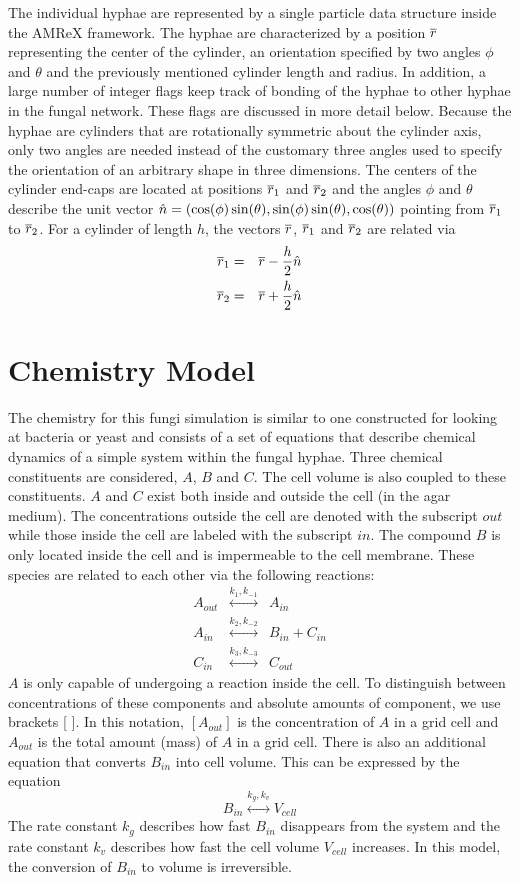 \documentclass[12pt]{article}
\begin{document}
The individual hyphae are represented by a single particle data structure inside
the AMReX framework. The hyphae are characterized by a position $\overline{r}$
representing the center of the cylinder, an orientation
specified by two angles $\phi$ and $\theta$ and the previously mentioned cylinder
length and radius. In addition, a large number of integer flags keep track of
bonding of the hyphae to other hyphae in the fungal network. These flags are
discussed in more detail below. Because the hyphae are cylinders that are rotationally
symmetric about the cylinder axis, only two angles are needed instead of the
customary three angles used to specify the orientation of an arbitrary shape
in three dimensions. The centers of the cylinder end-caps are located at positions
$\overline{r}_1$ and $\overline{r}_2$ and the angles $\phi$ and $\theta$ describe the unit vector
$\hat{n} = (\cos(\phi)\sin(\theta),\sin(\phi)\sin(\theta),\cos(\theta))$ pointing
from $\overline{r}_1$ to $\overline{r}_2$. For a cylinder of length $h$, the vectors $\overline{r}$,
$\overline{r}_1$ and $\overline{r}_2$ are related via
\begin{eqnarray*}
\overline{r}_1 & = & \overline{r} - \frac{h}{2}\hat{n} \\
\overline{r}_2 & = & \overline{r} + \frac{h}{2}\hat{n}
\end{eqnarray*}

\section{Chemistry Model}
The chemistry for this fungi simulation is similar to one constructed for looking
at bacteria or yeast and consists of a set
of equations that describe chemical dynamics of a simple system within
the fungal hyphae. Three chemical
constituents are considered, $A$, $B$
and $C$. The cell volume is also coupled to these constituents. $A$ and $C$
exist both inside and outside the cell (in the
agar medium). The concentrations outside the cell are denoted with the
subscript $out$ while those inside the cell are labeled
with the subscript $in$. The compound $B$ is only located inside the cell and
is impermeable to the cell membrane.
These species are related to each other via the following reactions:
\begin{eqnarray*}
A_{out} &\stackrel{k_{1},k_{-1}}{\longleftrightarrow}& A_{in} \\
A_{in} &\stackrel{k_2,k_{-2}}{\longleftrightarrow}& B_{in} + C_{in} \\
C_{in} &\stackrel{k_3,k_{-3}}{\longleftrightarrow}& C_{out}
\end{eqnarray*}
$A$ is only capable of undergoing a reaction inside the cell.  To distinguish
between concentrations of these components and absolute amounts of component, we use
brackets [ ]. In this notation, $[A_{out}]$ is the concentration of $A$ in a grid cell and
$A_{out}$ is the total amount (mass) of $A$ in a grid cell. There is also an
additional equation that converts $B_{in}$ into cell volume. This can be
expressed by the equation
\[
B_{in} \stackrel{k_g,k_v}{\longleftrightarrow} V_{cell}
\]
The rate constant $k_g$ describes how fast $B_{in}$ disappears from the system
and the rate constant $k_v$ describes how fast the cell volume $V_{cell}$
increases. In this model, the conversion of $B_{in}$ to volume is irreversible.
\end{document}
